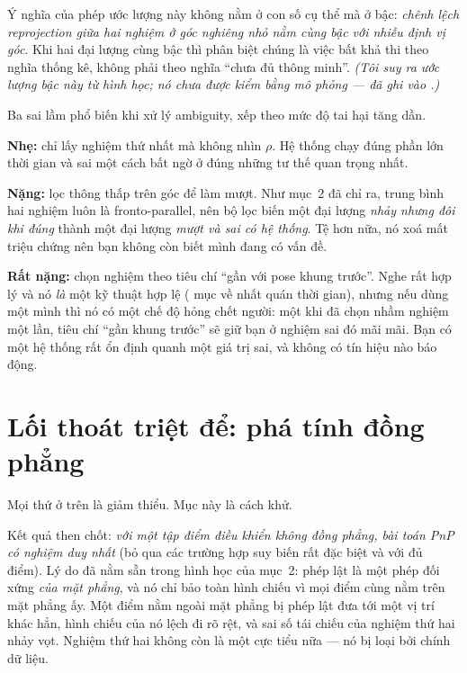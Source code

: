 \documentclass[../../marker.tex]{subfiles}
\begin{document}
Ý nghĩa của phép ước lượng này không nằm ở con số cụ thể mà ở bậc: \emph{chênh lệch reprojection giữa hai nghiệm ở góc nghiêng nhỏ nằm cùng bậc với nhiễu định vị góc}. Khi hai đại lượng cùng bậc thì phân biệt chúng là việc bất khả thi theo nghĩa thống kê, không phải theo nghĩa ``chưa đủ thông minh''. \emph{(Tôi suy ra ước lượng bậc này từ hình học; nó chưa được kiểm bằng mô phỏng --- đã ghi vào .)}

\begin{cambay}
Ba sai lầm phổ biến khi xử lý ambiguity, xếp theo mức độ tai hại tăng dần.

\textbf{Nhẹ:} chỉ lấy nghiệm thứ nhất mà không nhìn \(\rho\). Hệ thống chạy đúng phần lớn thời gian và sai một cách bất ngờ ở đúng những tư thế quan trọng nhất.

\textbf{Nặng:} lọc thông thấp trên góc để làm mượt. Như mục~2 đã chỉ ra, trung bình hai nghiệm luôn là fronto-parallel, nên bộ lọc biến một đại lượng \emph{nhảy nhưng đôi khi đúng} thành một đại lượng \emph{mượt và sai có hệ thống}. Tệ hơn nữa, nó xoá mất triệu chứng nên bạn không còn biết mình đang có vấn đề.

\textbf{Rất nặng:} chọn nghiệm theo tiêu chí ``gần với pose khung trước''. Nghe rất hợp lý và nó \emph{là} một kỹ thuật hợp lệ ( mục về nhất quán thời gian), nhưng nếu dùng một mình thì nó có một chế độ hỏng chết người: một khi đã chọn nhầm nghiệm một lần, tiêu chí ``gần khung trước'' sẽ giữ bạn ở nghiệm sai đó mãi mãi. Bạn có một hệ thống rất ổn định quanh một giá trị sai, và không có tín hiệu nào báo động.
\end{cambay}

\section{Lối thoát triệt để: phá tính đồng phẳng}

Mọi thứ ở trên là giảm thiểu. Mục này là cách khử.

Kết quả then chốt: \emph{với một tập điểm điều khiển không đồng phẳng, bài toán PnP có nghiệm duy nhất} (bỏ qua các trường hợp suy biến rất đặc biệt và với đủ điểm). Lý do đã nằm sẵn trong hình học của mục~2: phép lật là một phép đối xứng \emph{của mặt phẳng}, và nó chỉ bảo toàn hình chiếu vì mọi điểm cùng nằm trên mặt phẳng ấy. Một điểm nằm ngoài mặt phẳng bị phép lật đưa tới một vị trí khác hẳn, hình chiếu của nó lệch đi rõ rệt, và sai số tái chiếu của nghiệm thứ hai nhảy vọt. Nghiệm thứ hai không còn là một cực tiểu nữa --- nó bị loại bởi chính dữ liệu.
\end{document}
